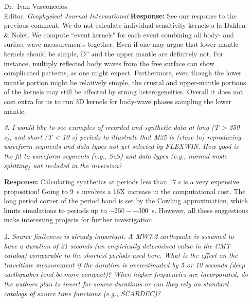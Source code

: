 \documentclass[11pt,a4paper]{letter}
\newcommand{\cyan}[1]{\textbf{\textcolor{Cyan}{#1}}}
\newcommand{\orange}[1]{\textbf{\textcolor{Orange}{#1}}}
\newcommand{\toebru}[1]{\textbf{\cyan{*** Ebru: #1 ***}}}
\newcommand{\fromebru}[1]{\textbf{\orange{*** Ebru: #1 ***}}}
\newcommand{\response}[1]{\textbf{Response:} #1}
\newcommand{\rev}[1]{{\it{#1}}}
\begin{document}
\begin{letter}{Dr.~Ivan Vasconcelos\\
Editor, \textit{Geophysical Journal International}}
\response{See our response to the previous comment. We do not calculate individual sensitivity kernels a la Dahlen \& Nolet. We compute ``event kernels" for each event combining all body- and surface-wave measurements together. Even if one may argue that lower mantle kernels should be simple, D'' and the upper mantle are definitely not. For instance, multiply reflected body waves from the free surface can show complicated patterns, as one might expect. Furthermore, even though the lower mantle portion might be relatively simple, the crustal and upper-mantle portions of the kernels may still be affected by strong heterogeneities. Overall it does not cost extra for us to run 3D kernels for body-wave phases sampling the lower mantle. 
}

\rev{3. I would like to see examples of recorded and synthetic data at long (T > 250 s), and short (T < 10 s) periods to illustrate that M25 is (close to) reproducing waveform segments and data types not yet selected by FLEXWIN. How good is the fit to waveform segments (e.g., ScS) and data types (e.g., normal mode splitting) not included in the inversion?
}

\response{Calculating synthetics at periods less than 17 s is a very expensive proposition! Going to 9~s involves a 16X increase in the computational cost. The long period corner of the period band is set by the Cowling approximation,
which limits simulations to periods up to $\sim250--300$~s. However, all these suggestions make interesting projects for further investigation.
}

\rev{4. Source finiteness is already important. A MW7.2 earthquake is assumed to have a duration of 21 seconds (an empirically determined value in the CMT catalog) comparable to the shortest periods used here. What is the effect on the traveltime measurement if the duration is overestimated by 5 or 10 seconds (deep earthquakes tend be more compact)? When higher frequencies are incorporated, do the authors plan to invert for source durations or can they rely on standard catalogs of source time functions (e.g., SCARDEC)?
}


\end{letter}
\end{document}
